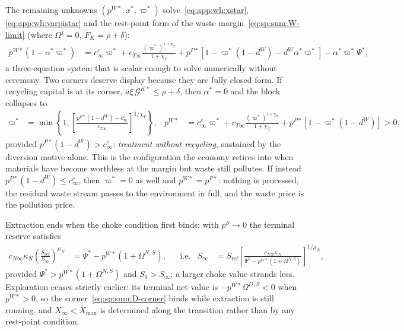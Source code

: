  The remaining unknowns $\left(p^{W*},x^*,\varpi^*\right)$ solve~\eqref{eq:app:wh:xstar}, \eqref{eq:app:wh:varpistar} and the rest-point form of the waste margin~\eqref{eq:sp:sum:W-limit} (where $\Omega^j=0$, $\tilde F_K=\rho+\delta$):
\begin{align}
p^{W*}\left(1-\alpha^*\varpi^*\right) &= c^{c}_\infty\varpi^*+c_{T\infty}\frac{\left(\varpi^*\right)^{1+\chi_T}}{1+\chi_T}+p^{P*}\left[1-\varpi^*\left(1-d^W\right)-d^W\alpha^*\varpi^*\right]-\alpha^*\varpi^*\Psi^* ,
\label{eq:app:wh:pWstar}
\end{align}
a three-equation system that is scalar enough to solve numerically without ceremony. Two corners deserve display because they are fully closed form. If recycling capital is at its corner, $\bar a\xi\,\mathcal G^{K*}\le\rho+\delta$, then $\alpha^*=0$ and the block collapses to
\begin{align}
\varpi^* &= \min\left\{1,\left[\frac{p^{P*}\left(1-d^W\right)-c^c_\infty}{c_{T\infty}}\right]^{1/\chi_T}\right\},
&
p^{W*} &= c^c_\infty\varpi^*+c_{T\infty}\frac{\left(\varpi^*\right)^{1+\chi_T}}{1+\chi_T}+p^{P*}\left[1-\varpi^*\left(1-d^W\right)\right]>0,
\label{eq:app:wh:corner}
\end{align}
provided $p^{P*}\left(1-d^W\right)>c^c_\infty$: \emph{treatment without recycling}, sustained by the diversion motive alone. This is the configuration the economy retires into when materials have become worthless at the margin but waste still pollutes. If instead $p^{P*}\left(1-d^W\right)\le c^c_\infty$, then $\varpi^*=0$ as well and $p^{W*}=p^{P*}$: nothing is processed, the residual waste stream passes to the environment in full, and the waste price is the pollution price.

 Extraction ends when the choke condition first binds; with $p^{S}\to0$ the terminal reserve satisfies
\begin{align}
c_{N\infty}\kappa_N\left(\frac{S_{\mathrm{ref}}}{S_\infty}\right)^{\mu_N} &= \Psi^*-p^{W*}\left(1+\Omega^{N,S}\right),
&&\text{i.e.}
&
S_\infty &= S_{\mathrm{ref}}\left[\frac{c_{N\infty}\kappa_N}{\Psi^*-p^{W*}\left(1+\Omega^{N,S}\right)}\right]^{1/\mu_N},
\label{eq:app:wh:stranded}
\end{align}
provided $\Psi^*>p^{W*}\left(1+\Omega^{N,S}\right)$ and $S_0>S_\infty$; a larger choke value strands less. Exploration ceases strictly earlier: its terminal net value is $-p^{W*}\Omega^{D,S}<0$ when $p^{W*}>0$, so the corner~\eqref{eq:sp:sum:D-corner} binds while extraction is still running, and $X_\infty<\bar X_{\max}$ is determined along the transition rather than by any rest-point condition.

